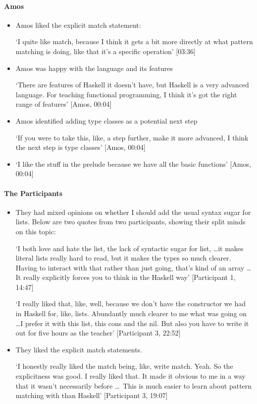 \paragraph{Amos}
\begin{itemize}

    \item Amos liked the explicit match statement:
    
    `I quite like match, because I think it gets a bit more directly at what pattern matching is doing, like that it's a specific operation' [03:36]

    \item Amos was happy with the language and its features
    
    `There are features of Haskell it doesn't have, but Haskell is a very advanced language. For teaching functional programming, I think it's got the right range of features' [Amos, 00:04]

    \item Amos identified adding type classes as a potential next step 
    
    `If you were to take this, like, a step further, make it more advanced, I think the next step is type
    classes' [Amos, 00:04]
    
    \item `I like the stuff in the prelude because we have all the basic functions' [Amos, 00:04]
\end{itemize}

\paragraph{The Participants}\begin{itemize}
    \item They had mixed opinions on whether I should add the usual syntax sugar for lists. Below are two quotes from two participants, showing their split minds on this topic:
    
    `I both love and hate the list, the lack of syntactic sugar for list, \ldots it makes literal lists really hard to read, but it makes the types so much clearer. Having to interact with that rather than just going, that's kind of an array \ldots It really explicitly forces you to think in the Haskell
    way' [Participant 1, 14:47]
    
    `I really liked that, like, well, because we don't have the constructor we had in Haskell
    for, like, lists. Abundantly much clearer to me what was going on \ldots I prefer it with this list, this cons and the nil. But also you have to write it out for five hours as the teacher' [Participant 3, 22:52]

    \item They liked the explicit match statements. 
    
    `I honestly really liked the match being, like, write match. Yeah. So the
    explicitness was good. I really liked that. It made it obvious to me in a way that it wasn't necessarily before \ldots\ This is much easier to learn about pattern matching with than Haskell' [Participant 3, 19:07]
\end{itemize}

